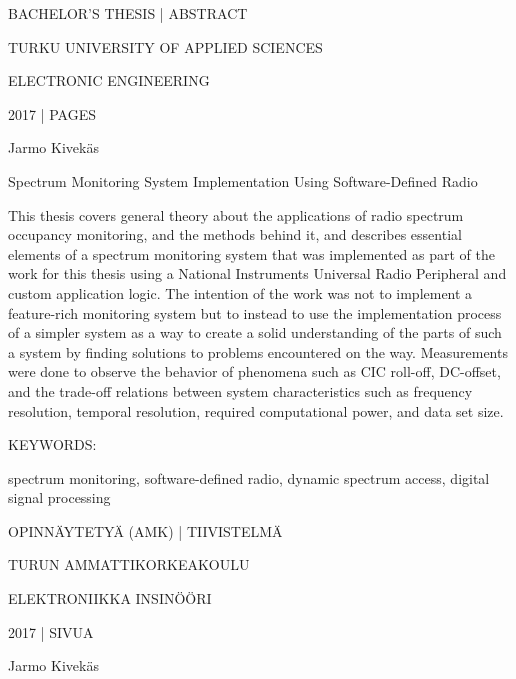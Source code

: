 BACHELOR'S THESIS | ABSTRACT

TURKU UNIVERSITY OF APPLIED SCIENCES

ELECTRONIC ENGINEERING

2017 | \pageref{LastPage} PAGES


\vspace{10mm}
{\Large Jarmo Kivekäs \par}

\vspace{10mm}
{\huge Spectrum Monitoring System Implementation Using Software-Defined Radio \par}

\vspace{10mm}



This thesis covers general theory about the applications of radio spectrum occupancy
monitoring, and the methods behind it, and describes essential elements of a
spectrum monitoring system that was implemented as part of the work for this
thesis using a National Instruments Universal Radio Peripheral and custom
application logic. The intention of the work was not to implement a feature-rich
monitoring system but to instead to use the implementation process of a simpler
system as a way to create a solid understanding of the parts of such
a system by finding solutions to problems encountered on the way.
Measurements were done to observe the behavior of phenomena such as CIC roll-off,
DC-offset, and the trade-off relations between system characteristics such as
frequency resolution, temporal resolution, required computational power,
and data set size.



\vspace{30mm}

KEYWORDS:

spectrum monitoring, software-defined radio, dynamic spectrum access, digital signal processing



\clearpage


OPINNÄYTETYÄ (AMK) | TIIVISTELMÄ

TURUN AMMATTIKORKEAKOULU

ELEKTRONIIKKA INSINÖÖRI

2017 | \pageref{LastPage} SIVUA


\vspace{10mm}
{\Large Jarmo Kivekäs \par}

